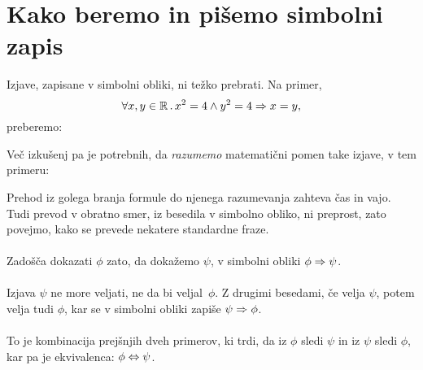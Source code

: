 
\section{Kako beremo in pišemo simbolni zapis}
\label{sec:simbolni-zapis}

Izjave, zapisane v simbolni obliki, ni težko prebrati. Na primer,
%
\begin{equation*}
  \forall x, y \in \mathbb{R} \,.\,
    x^2 = 4 \land y^2 = 4 \Rightarrow x = y,
\end{equation*}
%
preberemo:
%
\begin{quote}
\end{quote}
%
Več izkušenj pa je potrebnih, da \emph{razumemo} matematični pomen
take izjave, v tem primeru:
%
\begin{quote}
\end{quote}
%
Prehod iz golega branja formule do njenega razumevanja zahteva čas in vajo.
Tudi prevod v obratno smer, iz besedila v simbolno obliko, ni preprost,
zato povejmo, kako se prevede nekatere standardne fraze.

\paragraph{}
%
Zadošča dokazati $\phi$ zato, da dokažemo $\psi$, v simbolni obliki $\phi \Rightarrow \psi$.

\paragraph{}
%
Izjava $\psi$ ne more veljati, ne da bi veljal~$\phi$. Z drugimi
besedami, če velja $\psi$, potem velja tudi $\phi$, kar se v simbolni obliki
zapiše $\psi \Rightarrow \phi$.

\paragraph{}
%
To je kombinacija prejšnjih dveh primerov, ki trdi, da iz $\phi$ sledi
$\psi$ in iz $\psi$ sledi $\phi$, kar pa je ekvivalenca:
%
$\phi \Leftrightarrow \psi$.

